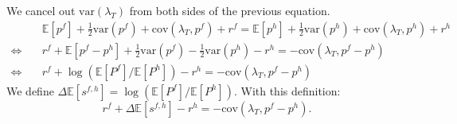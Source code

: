 We cancel out $\text{var}\left( \lambda_{T} \right)$ from both sides
of the previous equation.
\begin{align*}
  &\mathbb{E}\left[p^f\right]+\frac{1}{2}\text{var}\left(p^f\right) + \text{cov}\left(\lambda_T, p^f\right)+r^f
    = \mathbb{E}\left[p^h\right]+\frac{1}{2}\text{var}\left(p^h\right)+\text{cov}\left(\lambda_T,p^h\right)+r^h
  \\      \Leftrightarrow \quad
  & r^f+\mathbb{E}\left[p^f-p^h\right]+\frac{1}{2}\text{var}\left(p^f\right)-\frac{1}{2}\text{var}\left(p^h\right)-r^h = -\text{cov}\left(\lambda_T,p^f-p^h\right)\\   
  \Leftrightarrow\quad
  &r^f+\log\left(\mathbb{E}\left[P^f\right]/\mathbb{E}\left[P^h\right]\right)-r^h = -\text{cov}\left(\lambda_T,p^f-p^h\right)
\end{align*}
We define
$\Delta\mathbb{E}\left[s^{f,h}\right]
=\log\left(\mathbb{E}\left[P^f\right]/\mathbb{E}\left[P^h\right]\right).$
With this definition:
\begin{equation*}
  r^f+\Delta\mathbb{E}\left[s^{f,h}\right]-r^h = -\text{cov}\left(\lambda_T,p^f-p^h\right).
\end{equation*}
